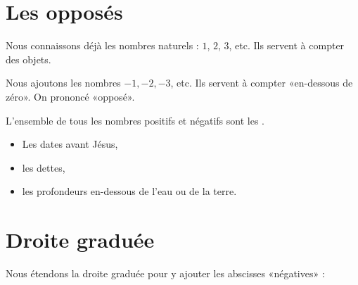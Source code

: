 



\section{Les opposés}

Nous connaissons déjà les nombres naturels : \( 1\), \( 2\), \( 3\), etc. Ils servent à compter des objets.
\begin{definition}
    Nous ajoutons les nombres \( -1, -2, -3\), etc. Ils servent à compter «en-dessous de zéro». On prononcé «opposé».
\end{definition}

\begin{definition}
    L'ensemble de tous les nombres positifs et négatifs sont les .
\end{definition}

\begin{example}
    \begin{itemize}
        \item Les dates avant Jésus,
        \item les dettes,
        \item les profondeurs en-dessous de l'eau ou de la terre.
    \end{itemize}
\end{example}

\section{Droite graduée}



Nous étendons la droite graduée pour y ajouter les abscisses «négatives» :
\begin{center}
    
\end{center}

